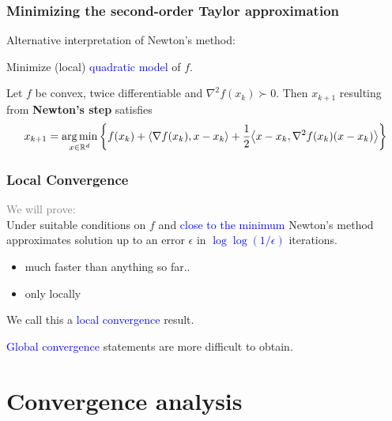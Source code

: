 \documentclass[aspectratio=149]{beamer}
\begin{document}
\begin{frame}
  \frametitle{Minimizing the second-order Taylor approximation}
  Alternative interpretation of Newton's method:\\
  \begin{block}{}
    \center
    Minimize (local) \textcolor{blue}{quadratic model} of $f$.
  \end{block}
  \begin{lemma}%
    Let $f$ be convex, twice differentiable and $\nabla^2 f(x_k) \succ 0$. Then $x_{k+1}$ resulting from \textbf{Newton's step} satisfies
    \begin{equation}
      x_{k+1} = \operatorname*{arg\,min}_{x \in \mathbb{R}^d} \left\{f(x_k) + \langle \nabla f(x_k), x-x_k \rangle + \frac12 \big \langle x-x_k, \nabla^2 f(x_k) (x-x_k)  \big\rangle \right\}
    \end{equation}
  \end{lemma}
\end{frame}


\begin{frame}
  \frametitle{Local Convergence}
  \textcolor{gray}{We will prove:}\\
  Under suitable conditions on $f$ and \textcolor{blue}{close to the minimum} Newton's method approximates solution up to an error $\epsilon$ in \textcolor{blue}{$\log \log (1/\epsilon)$} iterations.
  \begin{itemize}
    \item much faster than anything so far..
    \item only locally
  \end{itemize}
  \begin{block}{}
    We call this a \textcolor{blue}{local convergence} result.\\
  \end{block}

  \textcolor{blue}{Global convergence} statements are more difficult to obtain.
\end{frame}


\section{Convergence analysis}%
\end{document}
